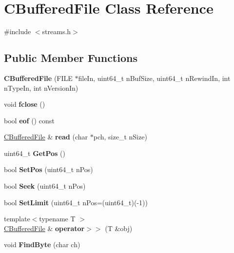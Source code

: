 \hypertarget{class_c_buffered_file}{}\section{C\+Buffered\+File Class Reference}
\label{class_c_buffered_file}


{\ttfamily \#include $<$streams.\+h$>$}

\subsection*{Public Member Functions}
\begin{DoxyCompactItemize}
\item 
\mbox{\label{class_c_buffered_file_a30ad96a8d09bed60355d1fadda7dabdc}} 
{\bfseries C\+Buffered\+File} (F\+I\+LE $\ast$file\+In, uint64\+\_\+t n\+Buf\+Size, uint64\+\_\+t n\+Rewind\+In, int n\+Type\+In, int n\+Version\+In)
\item 
\mbox{\label{class_c_buffered_file_aef8c993fe3eb0fa423d09d095f40dcf6}} 
void {\bfseries fclose} ()
\item 
\mbox{\label{class_c_buffered_file_af0ff112a5fd46ba3e8f2f1f4f36d5566}} 
bool {\bfseries eof} () const
\item 
\mbox{\label{class_c_buffered_file_a20c6d2a4dbc69a8e5c7ba766d04b3d85}} 
\mbox{\hyperlink{class_c_buffered_file}{C\+Buffered\+File}} \& {\bfseries read} (char $\ast$pch, size\+\_\+t n\+Size)
\item 
\mbox{\label{class_c_buffered_file_af9e7226e682ede9c1c141fb2972afd7b}} 
uint64\+\_\+t {\bfseries Get\+Pos} ()
\item 
\mbox{\label{class_c_buffered_file_aac4029a9aade127cc8a1fbbcc1549599}} 
bool {\bfseries Set\+Pos} (uint64\+\_\+t n\+Pos)
\item 
\mbox{\label{class_c_buffered_file_afbf9abcc70f24824661aec96a4310a63}} 
bool {\bfseries Seek} (uint64\+\_\+t n\+Pos)
\item 
\mbox{\label{class_c_buffered_file_adfcf370a41be0454e0f6b3dc358e415c}} 
bool {\bfseries Set\+Limit} (uint64\+\_\+t n\+Pos=(uint64\+\_\+t)(-\/1))
\item 
\mbox{\label{class_c_buffered_file_ab570d5f1a173a41100e7b42b4aacbbc5}} 
{\footnotesize template$<$typename T $>$ }\\\mbox{\hyperlink{class_c_buffered_file}{C\+Buffered\+File}} \& {\bfseries operator$>$$>$} (T \&obj)
\item 
\mbox{\label{class_c_buffered_file_a15ce0683ba5925939d33f098a948236b}} 
void {\bfseries Find\+Byte} (char ch)
\end{DoxyCompactItemize}
